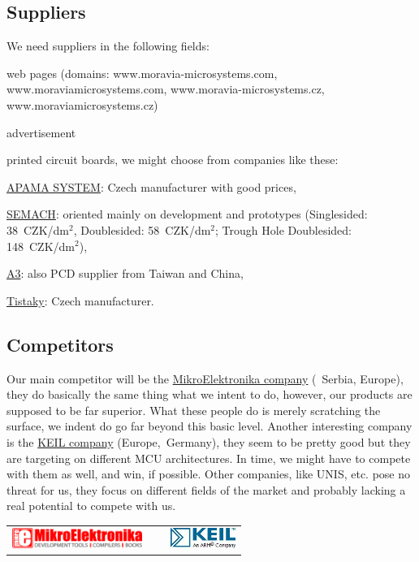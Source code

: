 \documentclass[a4paper,twoside,15pt]{book}
\begin{document}
		\subsection{Suppliers}
			We need suppliers in the following fields:
				\begin{dinglist}{73}
					\item web pages (domains: www.moravia-microsystems.com, www.moraviamicrosystems.com, www.moravia-microsystems.cz, www.moraviamicrosystems.cz)
					\item advertisement
					\item printed circuit boards, we might choose from companies like these:
					\begin{dinglist}{75}
						\item \href{http://www.apama.cz/}{APAMA SYSTEM}: Czech manufacturer with good prices,
						\item \href{http://www.semach.cz/}{SEMACH}: oriented mainly on development and prototypes (Singlesided: 38~CZK/dm$^2$, Doublesided: 58~CZK/dm$^2$; Trough Hole Doublesided: 148~CZK/dm$^2$),
						\item \href{http://www.a3.cz}{A3}: also PCD supplier from Taiwan and China,
						\item \href{http://www.tistaky.cz/}{Tistaky}: Czech manufacturer.
					\end{dinglist}
				\end{dinglist}

		\subsection{Competitors}
			Our main competitor will be the \href{http://www.mikroe.com/}{MikroElektronika company} (~Serbia, Europe), they do basically the same thing what we intent to do, however, our products are supposed to be far superior. What these people do is merely scratching the surface, we indent do go far beyond this basic level. Another interesting company is the \href{http://www.keil.com/}{KEIL company} (Europe,~Germany), they seem to be pretty good but they are targeting on different MCU architectures. In time, we might have to compete with them as well, and win, if possible. Other companies, like UNIS, etc. pose no threat for us, they focus on different fields of the market and probably lacking a real potential to compete with us.
			\begin{table}[h!]
				\centering{}
				\begin{tabular}{cp{40pt}c}
					\includegraphics[width=120pt]{images/MikroElektronika_logo.png}
						& ~ &
					\includegraphics[width=60pt]{images/KeilARM.jpg} \\
				\end{tabular}
			\end{table}
\end{document}
